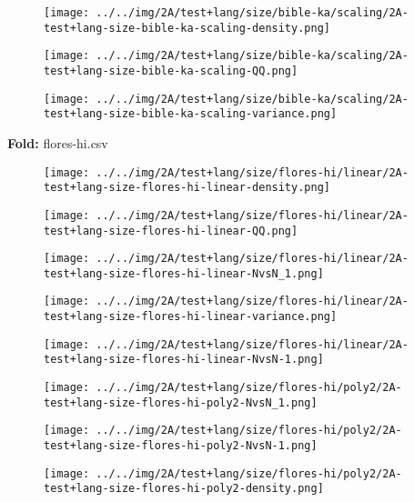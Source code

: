 \begin{figure}[H]
\centering	\texttt{[image: ../../img/2A/test+lang/size/bible-ka/scaling/2A-test+lang-size-bible-ka-scaling-density.png]}
\end{figure}
\begin{figure}[H]
\centering	\texttt{[image: ../../img/2A/test+lang/size/bible-ka/scaling/2A-test+lang-size-bible-ka-scaling-QQ.png]}
\end{figure}
\begin{figure}[H]
\centering	\texttt{[image: ../../img/2A/test+lang/size/bible-ka/scaling/2A-test+lang-size-bible-ka-scaling-variance.png]}
\end{figure}
\textbf{Fold:} flores-hi.csv
\begin{figure}[H]
\centering	\texttt{[image: ../../img/2A/test+lang/size/flores-hi/linear/2A-test+lang-size-flores-hi-linear-density.png]}
\end{figure}
\begin{figure}[H]
\centering	\texttt{[image: ../../img/2A/test+lang/size/flores-hi/linear/2A-test+lang-size-flores-hi-linear-QQ.png]}
\end{figure}
\begin{figure}[H]
\centering	\texttt{[image: ../../img/2A/test+lang/size/flores-hi/linear/2A-test+lang-size-flores-hi-linear-NvsN\_1.png]}
\end{figure}
\begin{figure}[H]
\centering	\texttt{[image: ../../img/2A/test+lang/size/flores-hi/linear/2A-test+lang-size-flores-hi-linear-variance.png]}
\end{figure}
\begin{figure}[H]
\centering	\texttt{[image: ../../img/2A/test+lang/size/flores-hi/linear/2A-test+lang-size-flores-hi-linear-NvsN-1.png]}
\end{figure}
\begin{figure}[H]
\centering	\texttt{[image: ../../img/2A/test+lang/size/flores-hi/poly2/2A-test+lang-size-flores-hi-poly2-NvsN\_1.png]}
\end{figure}
\begin{figure}[H]
\centering	\texttt{[image: ../../img/2A/test+lang/size/flores-hi/poly2/2A-test+lang-size-flores-hi-poly2-NvsN-1.png]}
\end{figure}
\begin{figure}[H]
\centering	\texttt{[image: ../../img/2A/test+lang/size/flores-hi/poly2/2A-test+lang-size-flores-hi-poly2-density.png]}
\end{figure}
